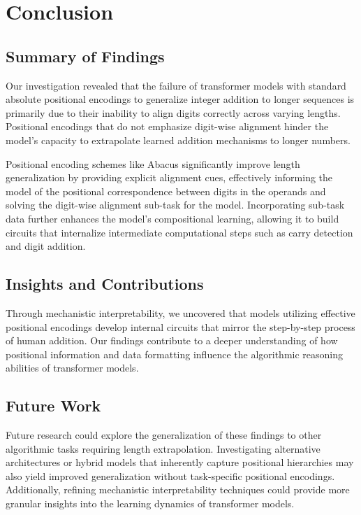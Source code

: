 \chapter{Conclusion}\label{conclusion}

\section{Summary of Findings}

Our investigation revealed that the failure of transformer models with standard absolute positional encodings to generalize integer addition to longer sequences is primarily due to their inability to align digits correctly across varying lengths. Positional encodings that do not emphasize digit-wise alignment hinder the model's capacity to extrapolate learned addition mechanisms to longer numbers.

Positional encoding schemes like Abacus significantly improve length generalization by providing explicit alignment cues, effectively informing the model of the positional correspondence between digits in the operands and solving the digit-wise alignment sub-task for the model. Incorporating sub-task data further enhances the model's compositional learning, allowing it to build circuits that internalize intermediate computational steps such as carry detection and digit addition.

\section{Insights and Contributions}

Through mechanistic interpretability, we uncovered that models utilizing effective positional encodings develop internal circuits that mirror the step-by-step process of human addition. Our findings contribute to a deeper understanding of how positional information and data formatting influence the algorithmic reasoning abilities of transformer models.

\section{Future Work}

Future research could explore the generalization of these findings to other algorithmic tasks requiring length extrapolation. Investigating alternative architectures or hybrid models that inherently capture positional hierarchies may also yield improved generalization without task-specific positional encodings. Additionally, refining mechanistic interpretability techniques could provide more granular insights into the learning dynamics of transformer models.

